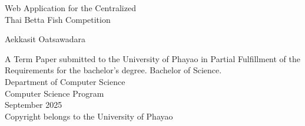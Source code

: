 \par
\endgroup
\clearpage

\thispagestyle{empty}
\begingroup


\noindent
\begin{minipage}[t]{\textwidth}
	\centering
	Web Application for the Centralized\\
	Thai Betta Fish Competition
\end{minipage}

\vspace*{\fill}
\begin{center}
	Aekkasit Oatsawadara
\end{center}

\vspace*{\fill}
\noindent
\begin{minipage}[b]{\textwidth}
	\centering
	A Term Paper submitted to the University of Phayao in Partial Fulfillment of the\\
	Requirements for the bachelor’s degree. Bachelor of Science.\\
	Department of Computer Science\\
	Computer Science Program\\
	September 2025\\
	Copyright belongs to the University of Phayao
\end{minipage}

\par
\endgroup
\clearpage

